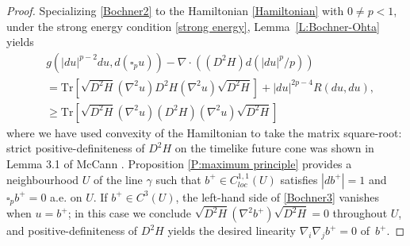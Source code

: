 \documentclass[12pt]{amsart}
\begin{document}
\begin{proof}
Specializing \eqref{Bochner2} to the Hamiltonian \eqref{Hamiltonian} with $0\ne p<1$, under    the strong energy condition \eqref{strong energy},
Lemma~\ref{L:Bochner-Ohta} yields
\begin{align}\nonumber
& g(|du|^{p-2} du , d (\square_p u)) 
-\nabla \cdot ((D^2 H) d (|du|^p/p)) 
\\ \label{Bochner3} 
&=\mathrm{Tr}\left[ \sqrt{D^2H} (\nabla^2 u) D^2 H (\nabla^2 u) \sqrt{D^2H}\right] + |du|^{2p-4} R(du, du),
\\& \ge \mathrm{Tr}\left[ \sqrt{D^2H} (\nabla^2 u) (D^2 H) (\nabla^2 u) \sqrt{D^2H}\right] 
\nonumber
\end{align}
where we have used convexity of the Hamiltonian to take the matrix square-root: strict positive-definiteness of $D^2 H$ on the timelike future cone was shown in Lemma 3.1 of McCann
\cite{McCann20}.
Proposition \ref{P:maximum principle} 
provides a neighbourhood $U$ of the line $\gamma$ such that $b^+ \in C^{1,1}_{loc}(U)$ satisfies $|db^+|=1$ and 
$\square_p b^+=0$ a.e. on $U$.
If $b^+ \in C^3(U)$,  the left-hand side of \eqref{Bochner3} vanishes when $u=b^+$; in this case we conclude $ \sqrt{D^2H} (\nabla^2 b^+) \sqrt{D^2H}=0$ throughout $U$, and
positive-definiteness of $D^2 H$ yields the desired linearity $\nabla_i \nabla_j b^+=0$ of~$b^+$.


\end{proof}
\end{document}
